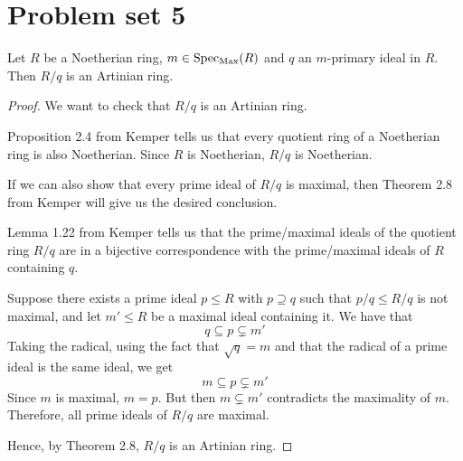 \section*{Problem set 5}

\begin{problem}
Let \(R\) be a Noetherian ring, \(m \in \operatorname{Spec_{Max}}(R)\) and \(q\) an \(m\)-primary ideal in \(R\). Then \(R/q\) is an Artinian ring.
\begin{proof}
We want to check that \(R/q\) is an Artinian ring.

Proposition 2.4 from Kemper tells us that every quotient ring of a Noetherian ring is also Noetherian. Since \(R\) is Noetherian, \(R/q\) is Noetherian.

If we can also show that every prime ideal of \(R/q\) is maximal, then Theorem 2.8 from Kemper will give us the desired conclusion.

Lemma 1.22 from Kemper tells us that the prime/maximal ideals of the quotient ring \(R/q\) are in a bijective correspondence with the prime/maximal ideals of \(R\) containing \(q\).

Suppose there exists a prime ideal \(p \leq R\) with \(p \supseteq q\) such that \(p/q \leq R/q\) is not maximal, and let \(m' \leq R\) be a maximal ideal containing it. We have that
\[
    q \subseteq p \subsetneq m'
\]
Taking the radical, using the fact that \(\sqrt{q} = m\) and that the radical of a prime ideal is the same ideal, we get
\[
    m \subseteq p \subsetneq m'
\]
Since \(m\) is maximal, \(m = p\). But then \(m \subsetneq m'\) contradicts the maximality of \(m\). Therefore, all prime ideals of \(R/q\) are maximal.

Hence, by Theorem 2.8, \(R/q\) is an Artinian ring.
\end{proof}
\end{problem}

